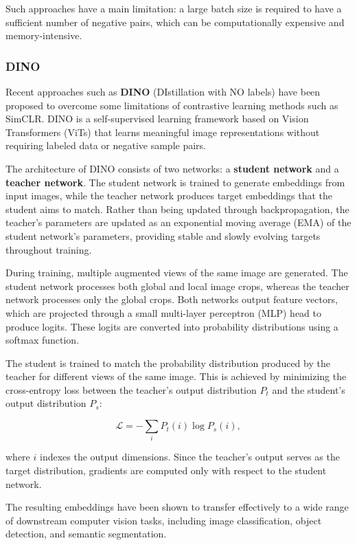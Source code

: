 Such approaches have a main limitation: a large batch size is required to have a sufficient number of negative pairs, which can be computationally expensive and memory-intensive.


\subsubsection{DINO}
Recent approaches such as \textbf{DINO} (DIstillation with NO labels) have been proposed to overcome some limitations of contrastive learning methods such as SimCLR. 
DINO is a self-supervised learning framework based on Vision Transformers (ViTs) that learns meaningful image representations without requiring labeled data or negative sample pairs.

The architecture of DINO consists of two networks: a \textbf{student network} and a \textbf{teacher network}. 
The student network is trained to generate embeddings from input images, while the teacher network produces target embeddings that the student aims to match. 
Rather than being updated through backpropagation, the teacher's parameters are updated as an exponential moving average (EMA) of the student network's parameters, 
providing stable and slowly evolving targets throughout training.

During training, multiple augmented views of the same image are generated. 
The student network processes both global and local image crops, whereas the teacher network processes only the global crops. 
Both networks output feature vectors, which are projected through a small multi-layer perceptron (MLP) head to produce logits. 
These logits are converted into probability distributions using a softmax function.

The student is trained to match the probability distribution produced by the teacher for different views of the same image. 
This is achieved by minimizing the cross-entropy loss between the teacher's output distribution $P_t$ and the student's output distribution $P_s$:

\[
\mathcal{L} = - \sum_{i} P_t(i)\log P_s(i),
\]

where $i$ indexes the output dimensions. Since the teacher's output serves as the target distribution, gradients are computed only with respect to the student network.

The resulting embeddings have been shown to transfer effectively to a wide range of downstream computer vision tasks, 
including image classification, object detection, and semantic segmentation.


